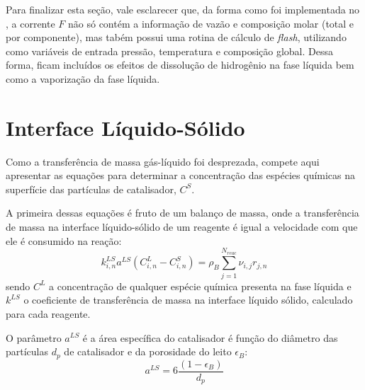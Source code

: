 Para finalizar esta seção, vale esclarecer que, da forma como foi implementada
no \emso, a corrente $F$ não só contém a informação de vazão e composição molar
(total e por componente), mas tabém possui uma rotina de cálculo de
\emph{flash}, utilizando como variáveis de entrada pressão, temperatura e
composição global. Dessa forma, ficam incluídos os efeitos de dissolução de
hidrogênio na fase líquida bem como a vaporização da fase líquida.


\section{Interface Líquido-Sólido} \label{sec:interfaceliquidosolido}

Como a transferência de massa gás-líquido foi desprezada, compete aqui
apresentar as equações para determinar a concentração das espécies químicas
na superfície das partículas de catalisador, $C^S$. 

A primeira dessas equações é fruto de um balanço de massa, onde a
transferência de massa na interface líquido-sólido de um reagente é igual a
velocidade com que ele é consumido na reação:
\begin{equation}
k_{i,n}^{LS}a^{LS}(C^L_{i,n}-C^S_{i,n}) = \rho_B
\displaystyle\sum_{j=1}^{N_{reac}}
\nu_{i,j}r_{j,n}
\label{eq:transferenciamassa}
\end{equation}
sendo $C^{L}$ a concentração de qualquer espécie química presenta na fase
líquida e $k^{LS}$ o coeficiente de transferência de massa na interface líquido
sólido, calculado para cada reagente.


O parâmetro $a^{LS}$ é a área específica do catalisador é função do diâmetro
das partículas $d_p$ de catalisador e da porosidade do leito $\epsilon_B$:
\begin{equation}
a^{LS} = 6 \dfrac{(1-\epsilon_B)}{d_p}
\label{eq:aLS}
\end{equation}


